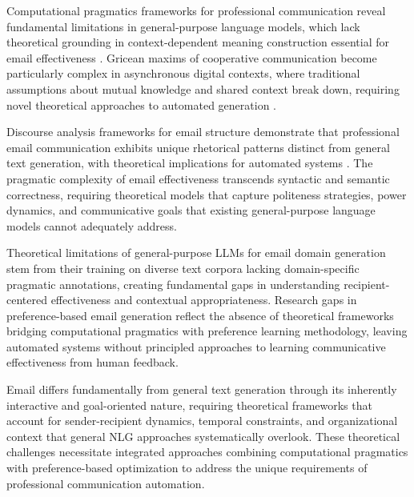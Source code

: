 Computational pragmatics frameworks for professional communication reveal fundamental limitations in general-purpose language models, which lack theoretical grounding in context-dependent meaning construction essential for email effectiveness \cite{brown1987politeness}. Gricean maxims of cooperative communication become particularly complex in asynchronous digital contexts, where traditional assumptions about mutual knowledge and shared context break down, requiring novel theoretical approaches to automated generation \cite{brown1987politeness, yus2011contextual_constraints}.

Discourse analysis frameworks for email structure demonstrate that professional email communication exhibits unique rhetorical patterns distinct from general text generation, with theoretical implications for automated systems \cite{zhang2019email_subject}. The pragmatic complexity of email effectiveness transcends syntactic and semantic correctness, requiring theoretical models that capture politeness strategies, power dynamics, and communicative goals that existing general-purpose language models cannot adequately address.

Theoretical limitations of general-purpose LLMs for email domain generation stem from their training on diverse text corpora lacking domain-specific pragmatic annotations, creating fundamental gaps in understanding recipient-centered effectiveness and contextual appropriateness. Research gaps in preference-based email generation reflect the absence of theoretical frameworks bridging computational pragmatics with preference learning methodology, leaving automated systems without principled approaches to learning communicative effectiveness from human feedback.

Email differs fundamentally from general text generation through its inherently interactive and goal-oriented nature, requiring theoretical frameworks that account for sender-recipient dynamics, temporal constraints, and organizational context that general NLG approaches systematically overlook. These theoretical challenges necessitate integrated approaches combining computational pragmatics with preference-based optimization to address the unique requirements of professional communication automation.

